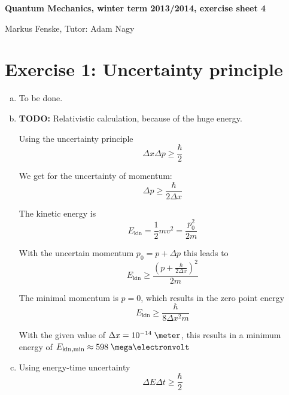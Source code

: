 \documentclass[a4paper,german,12pt,smallheadings]{scrartcl}
\begin{document}
\begin{center}
\bfseries %
\sffamily %
\vspace{-40pt}
Quantum Mechanics, winter term 2013/2014, exercise sheet 4

Markus Fenske, Tutor: Adam Nagy
\vspace{-10pt}
\end{center}

\section*{Exercise 1: Uncertainty principle}
\begin{enumerate}[a)]
  \item To be done.
  \item
    \textbf{TODO:} Relativistic calculation, because of the huge energy.

    Using the uncertainty principle
    \begin{equation*}
      \Delta x \Delta p \ge \frac{\hbar}{2}
    \end{equation*}

    We get for the uncertainty of momentum:
    \begin{equation*}
      \Delta p \ge \frac{\hbar}{2 \Delta x}
    \end{equation*}

    The kinetic energy is
    \begin{equation*}
      E_\text{kin} = \frac{1}{2} mv^2 = \frac{p_0^2}{2m}
    \end{equation*}

    With the uncertain momentum $p_0 = p + \Delta p$ this leads to
    \begin{equation*}
      E_\text{kin} \ge \frac{(p + \frac{\hbar}{2 \Delta x})^2}{2m}
    \end{equation*}

    The minimal momentum is $p=0$, which results in the zero point energy
    \begin{equation*}
      E_\text{kin} \ge \frac{\hbar}{8 \Delta x^2 m}
    \end{equation*}

    With the given value of $\Delta x = 10^{-14} \; \meter$, this results in a
    minimum energy of $E_\text{kin,min} \approx 598 \; \mega\electronvolt$

  \item
    Using energy-time uncertainty
    \begin{equation*}
      \Delta E \Delta t \ge \frac{\hbar}{2}
    \end{equation*}


\end{enumerate}
\end{document}
